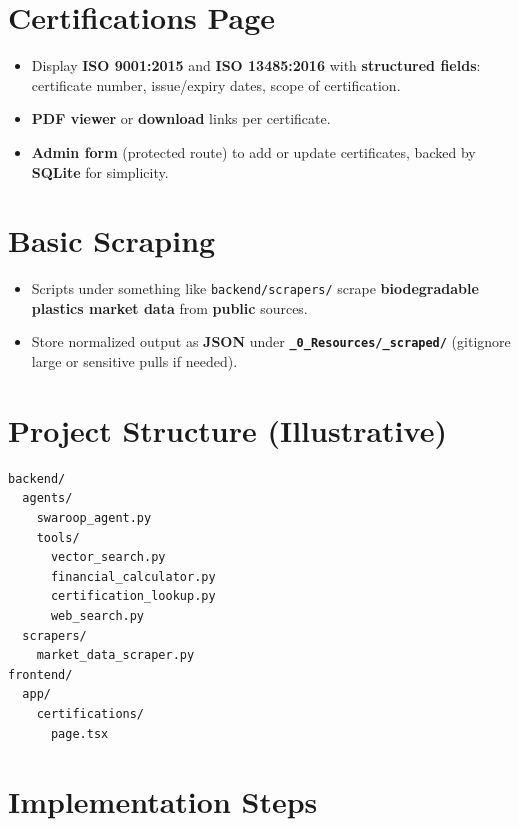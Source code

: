 \documentclass{article}
\begin{document}
\section{Certifications Page}

\begin{itemize}[leftmargin=*]
  \item Display \textbf{ISO 9001:2015} and \textbf{ISO 13485:2016} with \textbf{structured fields}: certificate number, issue/expiry dates, scope of certification.
  \item \textbf{PDF viewer} or \textbf{download} links per certificate.
  \item \textbf{Admin form} (protected route) to add or update certificates, backed by \textbf{SQLite} for simplicity.
\end{itemize}

\section{Basic Scraping}

\begin{itemize}[leftmargin=*]
  \item Scripts under something like \texttt{backend/scrapers/} scrape \textbf{biodegradable plastics market data} from \textbf{public} sources.
  \item Store normalized output as \textbf{JSON} under \textbf{\texttt{\_0\_Resources/\_scraped/}} (gitignore large or sensitive pulls if needed).
\end{itemize}

\section{Project Structure (Illustrative)}

\begin{lstlisting}[language={},basicstyle=\ttfamily\footnotesize]
backend/
  agents/
    swaroop_agent.py
    tools/
      vector_search.py
      financial_calculator.py
      certification_lookup.py
      web_search.py
  scrapers/
    market_data_scraper.py
frontend/
  app/
    certifications/
      page.tsx
\end{lstlisting}

\section{Implementation Steps}
\end{document}
